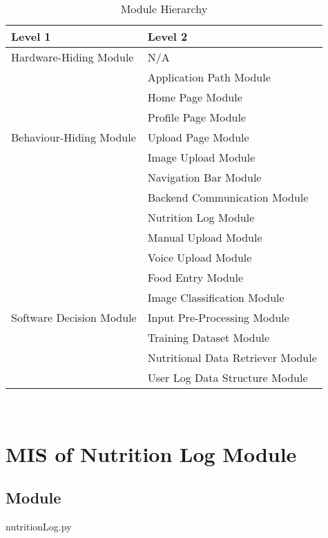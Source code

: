 \documentclass[12pt, titlepage]{article}
\begin{document}
\begin{table}[h!]
\centering
\begin{tabular}{p{} p{}}
	\toprule
	\textbf{Level 1} & \textbf{Level 2}\\
	\midrule
	
	{Hardware-Hiding Module} & N/A \\
	\midrule
	
	\multirow{7}{0.3\textwidth}{Behaviour-Hiding Module} & Application Path Module\\
	& Home Page Module\\
	& Profile Page Module\\
	& Upload Page Module\\
	& Image Upload Module\\
	& Navigation Bar Module\\
	& Backend Communication Module\\ 
	& Nutrition Log Module\\
	& Manual Upload Module \\
	& Voice Upload Module \\
	& Food Entry Module \\
	\midrule
	
	\multirow{3}{0.3\textwidth}{Software Decision Module} & Image Classification Module\\
	& Input Pre-Processing Module\\
	& Training Dataset Module\\
	& Nutritional Data Retriever Module\\
	& User Log Data Structure Module\\
	\bottomrule
	
\end{tabular}
\caption{Module Hierarchy}
\label{TblMH}
\end{table}

\newpage
~\newpage

\section{MIS of Nutrition Log Module} \label{Module} 



\subsection{Module}
nutritionLog.py
\end{document}
